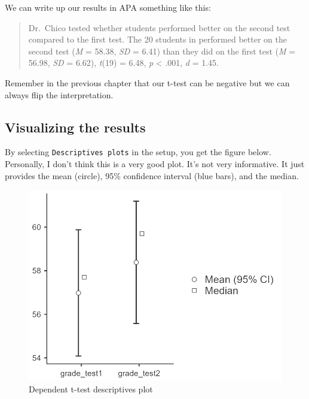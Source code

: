 \documentclass[
]{book}
\begin{document}
We can write up our results in APA something like this:

\begin{quote}
Dr.~Chico tested whether students performed better on the second test compared to the first test. The 20 students in performed better on the second test (\emph{M} = 58.38, \emph{SD} = 6.41) than they did on the first test (\emph{M} = 56.98, \emph{SD} = 6.62), \emph{t}(19) = 6.48, \emph{p} \textless{} .001, \emph{d} = 1.45.
\end{quote}

Remember in the previous chapter that our t-test can be negative but we can always flip the interpretation.

\hypertarget{visualizing-the-results-1}{%
\subsection{Visualizing the results}\label{visualizing-the-results-1}}

By selecting \texttt{Descriptives\ plots} in the setup, you get the figure below. Personally, I don't think this is a very good plot. It's not very informative. It just provides the mean (circle), 95\% confidence interval (blue bars), and the median.

\begin{figure}

{\centering \includegraphics[width=1\linewidth]{images/03_dependent_t-test/dependent_results_plot} 

}

\caption{Dependent t-test descriptives plot}\label{fig:unnamed-chunk-8}
\end{figure}
\end{document}
